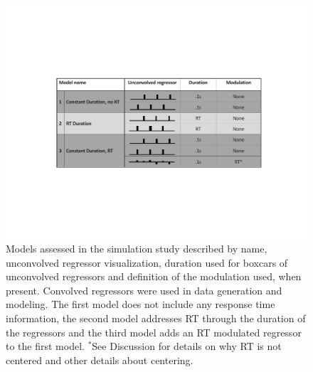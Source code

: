 \documentclass[titlepage,12pt] {article}
\begin{document}
\begin{figure}
  \centering
   \includegraphics[width=6in]{Figures/model_explainer_2cond.pdf}
   \caption{Models assessed in the simulation study described by name, unconvolved regressor visualization, duration used for boxcars of unconvolved regressors and definition of the modulation used, when present.  Convolved regressors were used in data generation and modeling.  The first model does not include any response time information, the second model addresses RT through the duration of the regressors and the third model adds an RT modulated regressor to the first model.  $^*$See Discussion for details on why RT is not centered and other details about centering.}
  \label{fig:models}
\end{figure}
\end{document}
